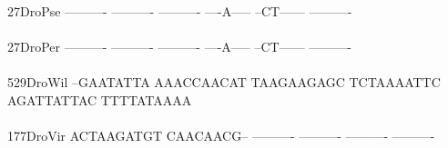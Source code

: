 \documentclass[11pt,twoside,reqno,a4paper]{article}
\begin{document}
{27\hspace*{3\charwidth}DroPse	----------	----------	----------	----A-----	--CT------	----------	\\
\hspace*{5\charwidth}\hspace*{7\charwidth}\hspace*{1\charwidth}\hspace*{1\charwidth}\hspace*{1\charwidth}\hspace*{1\charwidth}\hspace*{1\charwidth}\hspace*{1\charwidth}\\
27\hspace*{3\charwidth}DroPer	----------	----------	----------	----A-----	--CT------	----------	\\
\hspace*{5\charwidth}\hspace*{7\charwidth}\hspace*{1\charwidth}\hspace*{1\charwidth}\hspace*{1\charwidth}\hspace*{1\charwidth}\hspace*{1\charwidth}\hspace*{1\charwidth}\\
529\hspace*{2\charwidth}DroWil	--GAATATTA	AAACCAACAT	TAAGAAGAGC	TCTAAAATTC	AGATTATTAC	TTTTATAAAA	\\
\hspace*{5\charwidth}\hspace*{7\charwidth}\hspace*{1\charwidth}\hspace*{1\charwidth}\hspace*{1\charwidth}\hspace*{1\charwidth}\hspace*{1\charwidth}\hspace*{1\charwidth}\\
177\hspace*{2\charwidth}DroVir	ACTAAGATGT	CAACAACG--	----------	----------	----------	----------	\\
\hspace*{5\charwidth}\hspace*{7\charwidth}\hspace*{1\charwidth}\hspace*{1\charwidth}\hspace*{1\charwidth}\hspace*{1\charwidth}\hspace*{1\charwidth}\hspace*{1\charwidth}\\
}
\end{document}
